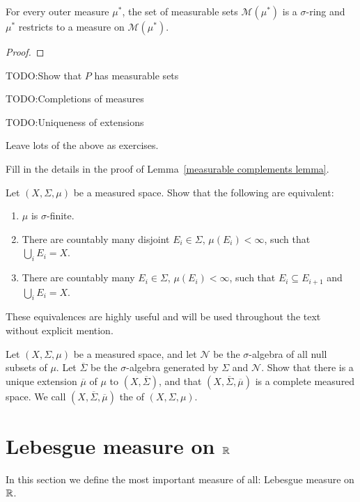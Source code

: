 \begin{lemma}
For every outer measure $\mu^{*}$, the set of measurable sets $\mathcal M(\mu^{*})$ is a $\sigma$-ring and $\mu^{*}$ restricts to a measure on $\mathcal M(\mu^{*})$.
\end{lemma}
\begin{proof}

\end{proof}



TODO:\@ Show that $P$ has measurable sets

TODO:\@ Completions of measures

TODO:\@ Uniqueness of extensions

Leave lots of the above as exercises.

\begin{exercise}\label{measurable complements}
Fill in the details in the proof of Lemma~\ref{measurable complements lemma}.
\end{exercise}

\begin{exercise}
Let $(X, \Sigma, \mu)$ be a measured space. Show that the following are equivalent:
\begin{enumerate}
\item $\mu$ is $\sigma$-finite.
\item There are countably many disjoint $E_{i} \in \Sigma$, $\mu(E_{i}) < \infty$, such that $\bigcup_{i} E_{i} = X$.
\item There are countably many $E_{i} \in \Sigma$, $\mu(E_{i}) < \infty$, such that $E_{i} \subseteq E_{i+1}$ and $\bigcup_{i} E_{i} = X$.
\end{enumerate}
These equivalences are highly useful and will be used throughout the text without explicit mention.
\end{exercise}

\begin{exercise}
Let $(X, \Sigma, \mu)$ be a measured space, and let $\mathcal N$ be the $\sigma$-algebra of all null subsets of $\mu$. Let $\overline \Sigma$ be the $\sigma$-algebra generated by $\Sigma$ and $\mathcal N$.
Show that there is a unique extension $\overline \mu$ of $\mu$ to $(X, \overline \Sigma)$, and that $(X, \overline \Sigma, \overline \mu)$ is a complete measured space.
We call $(X, \overline \Sigma, \overline \mu)$ the  of $(X, \Sigma, \mu)$.
\end{exercise}

\section{Lebesgue measure on $\mathbb{R}$}
In this section we define the most important measure of all: Lebesgue measure on $\mathbb{R}$.

